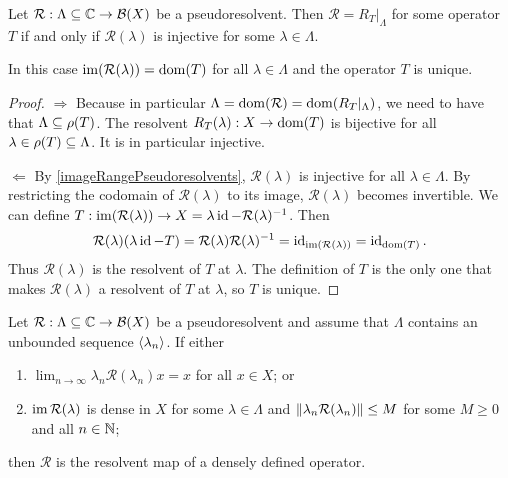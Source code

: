 \begin{proposition}
Let $\mathcal{R}:\Lambda \subseteq \mathbb{C} \to \operatorname{\mathcal{B}}(X)$ be a pseudoresolvent. Then $\mathcal{R} = R_T|_\Lambda$ for some operator $T$ \textup{if and only if} $\mathcal{R}(\lambda)$ is injective for some $\lambda\in\Lambda$.

In this case $\operatorname{im}(\mathcal{R}(\lambda)) = \operatorname{dom}(T)$ for all $\lambda\in \Lambda$ and the operator $T$ is unique.
\end{proposition}
\begin{proof}
$\boxed{\Rightarrow}$ Because in particular $\Lambda = \operatorname{dom}(\mathcal{R}) = \operatorname{dom}(R_T|_\Lambda)$, we need to have that $\Lambda \subseteq \rho(T)$. The resolvent $R_T(\lambda): X\to \operatorname{dom}(T)$ is bijective for all $\lambda\in \rho(T)\subseteq \Lambda$. It is in particular injective.

$\boxed{\Leftarrow}$ By \ref{imageRangePseudoresolvents}, $\mathcal{R}(\lambda)$ is injective for all $\lambda\in\Lambda$. By restricting the codomain of $\mathcal{R}(\lambda)$ to its image, $\mathcal{R}(\lambda)$ becomes invertible. We can define $T: \operatorname{im}(\mathcal{R}(\lambda)) \to X = \lambda\operatorname{id} - \mathcal{R}(\lambda)^{-1}$. Then
\[ \mathcal{R}(\lambda)(\lambda\operatorname{id} - T) = \mathcal{R}(\lambda)\mathcal{R}(\lambda)^{-1} = \operatorname{id}_{\operatorname{im}(\mathcal{R}(\lambda))} = \operatorname{id}_{\operatorname{dom}(T)}. \]
Thus $\mathcal{R}(\lambda)$ is the resolvent of $T$ at $\lambda$.
The definition of $T$ is the only one that makes $\mathcal{R}(\lambda)$ a resolvent of $T$ at $\lambda$, so $T$ is unique.
\end{proof}
\begin{corollary}
Let $\mathcal{R}:\Lambda \subseteq \mathbb{C} \to \operatorname{\mathcal{B}}(X)$ be a pseudoresolvent and assume that $\Lambda$ contains an unbounded sequence $\left\langle \lambda_n \right\rangle$. If either
\begin{enumerate}
\item $\lim_{n\to\infty}\lambda_n\mathcal{R}(\lambda_n)x = x$ for all $x\in X$; or
\item $\operatorname{im}\mathcal{R}(\lambda)$ is dense in $X$ for some $\lambda\in \Lambda$ and $\lVert\lambda_n \mathcal{R}(\lambda_n)\rVert \leq M$ for some $M\geq 0$ and all $n\in\mathbb{N}$;
\end{enumerate}
then $\mathcal{R}$ is the resolvent map of a densely defined operator.
\end{corollary}
